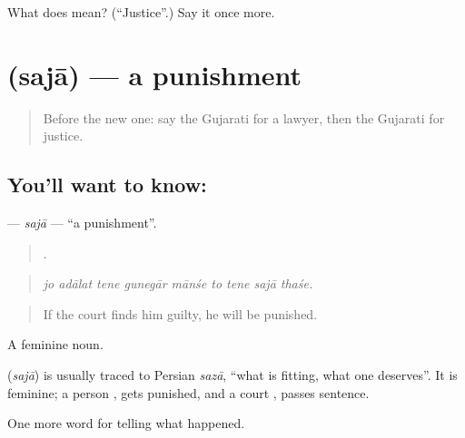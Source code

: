 \begin{tcolorbox}[breakable,colback=teal!4,colframe=teal!35!black,title={Before you move on}]
What does  mean? (\textquotedblleft{}Justice\textquotedblright{}.) Say it once more.
\end{tcolorbox}
\section[\texorpdfstring{\gu{સજા} (sajā)}{સજા (sajā)}]{ (sajā) — a punishment}

\label{lesson:GU-C289-saja}



\begin{quote}
Before the new one: say the Gujarati for a lawyer, then the Gujarati for justice.
\end{quote}

\subsection*{You'll want to know: }
\textbf{} — \emph{sajā} — \textquotedblleft{}a punishment\textquotedblright{}.

\begin{quote}
        .
\end{quote}

\begin{quote}
\emph{jo adālat tene gunegār mānśe to tene sajā thaśe.}
\end{quote}

\begin{quote}
If the court finds him guilty, he will be punished.
\end{quote}

A feminine noun.

\begin{cousinweb}
\textbf{} (\emph{sajā}) is usually traced to Persian \emph{sazā}, \textquotedblleft{}what is fitting, what one deserves\textquotedblright{}. It is feminine; a person \textbf{ }, gets punished, and a court \textbf{  }, passes sentence.
\end{cousinweb}

\begin{grammarlens}[title={What you've built}]
One more word for telling what happened.
\end{grammarlens}

